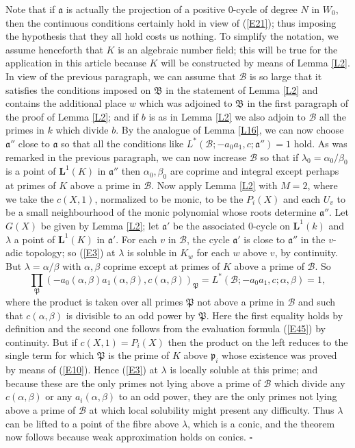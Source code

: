 \documentclass[12pt]{article}
\def\bL{{\mathbf L}}
\def\fa{{\mathfrak a}}
\def\fB{{\mathfrak B}}
\def\fp{{\mathfrak p}}
\def\fP{{\mathfrak P}}
\def\ga{{\alpha}}
\def\gb{{\beta}}
\def\gl{{\lambda}}
\def\sB{{\mathcal B}}
\def\qed{{\hfill$\square$}}
\begin{document}
Note that if $\fa$ is actually the projection of a positive 0-cycle of degree $N$
in $W_0$, then the continuous conditions certainly hold in
view of (\ref{E21}); thus imposing the hypothesis that they all hold costs
us nothing. To simplify the notation, we assume henceforth
that $K$ is an algebraic number field;
this will be true for the application in this article
because $K$ will be constructed by means of Lemma \ref{L2}.
In view of the previous paragraph, we can assume that $\sB$
is so large that it satisfies the conditions imposed on $\fB$
in the statement of Lemma \ref{L2} and contains the additional
place $w$ which was adjoined to $\fB$ in the first
paragraph of the proof of Lemma \ref{L2}; and if
$b$ is as in Lemma \ref{L2} we also adjoin to $\sB$ all the primes in $k$
which divide $b$. By the analogue of Lemma \ref{L16}, we can now choose
$\fa''$ close to $\fa$ so that all the conditions like
$L^*(\sB;-a_0a_1,c;\fa'')=1$ hold. As was remarked in the
previous paragraph, we can now increase $\sB$ so that if
$\gl_0=\ga_0/\gb_0$ is a
point of $\bL^1(K)$ in $\fa''$ then $\ga_0,\gb_0$ are coprime and integral
except perhaps at primes of $K$ above a prime in $\sB$. Now apply
Lemma \ref{L2} with $M=2$, where we take the $c(X,1)$, normalized to be monic,
to be the $P_i(X)$ and each $U_v$ to be a small neighbourhood of the
monic polynomial
whose roots determine $\fa''$. Let $G(X)$ be given by Lemma \ref{L2}; let
$\fa'$ be the associated 0-cycle on $\bL^1(k)$ and $\gl$ a point of $\bL^1(K)$
in $\fa'$. For each $v$ in $\sB$, the
cycle $\fa'$ is close to $\fa''$ in the $v$-adic topology; so (\ref{E3}) at
$\gl$ is soluble in $K_w$ for each $w$
above $v$, by continuity. But $\gl=\ga/\gb$ with $\ga,\gb$ coprime except
at primes of $K$ above a prime of $\sB$. So
\[ \prod_\fP(-a_0(\ga,\gb)a_1(\ga,\gb),c(\ga,\gb))_\fP=
L^*(\sB;-a_0a_1,c;\ga,\gb)=1, \]
where the product
is taken over all primes $\fP$ not above a prime in $\sB$ and such that
$c(\ga,\gb)$ is divisible to an odd power by $\fP$.
Here the first equality holds
by definition and the second one follows from the evaluation formula
(\ref{E45}) by continuity. But
if $c(X,1)=P_i(X)$ then the product on the left reduces to the single term
for which $\fP$ is the prime of $K$ above $\fp_i$ whose existence was proved by
means of (\ref{E10}). Hence (\ref{E3}) at $\gl$ is locally soluble at
this prime; and
because these are the only primes not lying above a prime of $\sB$ which
divide any $c(\ga,\gb)$ or any $a_i(\ga,\gb)$ to an odd power, they are
the only primes not lying above a prime of $\sB$ at which
local solubility might present any difficulty. Thus $\gl$ can
be lifted to a point of the fibre above $\gl$, which is a
conic, and the theorem now follows
because weak approximation holds on conics.  \qed
\end{document}
